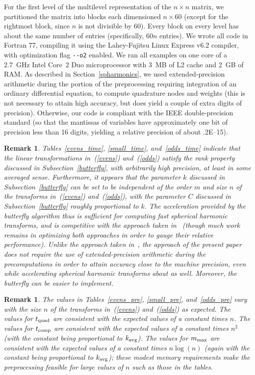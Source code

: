 \documentclass[final,3p,times]{elsarticle}
\newtheorem{remark1}[theorem]{Remark}
\newenvironment{remark}{\begin{remark1}\rm}{\end{remark1}}
\begin{document}
For the first level of the multilevel representation
of the $n \times n$ matrix, we partitioned the matrix
into blocks each dimensioned $n \times 60$
(except for the rightmost block, since $n$ is not divisible by 60).
Every block on every level has about the same number of entries
(specifically, $60n$ entries).
We wrote all code in Fortran 77, compiling it using
the Lahey-Fujitsu Linux Express v6.2 compiler, with optimization flag
{\tt {-}{-}o2} enabled.
We ran all examples on one core of a 2.7~GHz Intel Core~2 Duo microprocessor
with 3~MB of L2 cache and 2~GB of RAM.
As described in Section~\ref{spharmonics},
we used extended-precision arithmetic during the portion of the preprocessing
requiring integration of an ordinary differential equation,
to compute quadrature nodes and weights
(this is not necessary to attain high accuracy, but does yield a couple
of extra digits of precision).
Otherwise, our code is compliant with the IEEE double-precision standard
(so that the mantissas of variables have approximately one bit of precision
less than 16 digits, yielding a relative precision of about .2E--15).


\begin{remark}
\label{empirical_rank}
Tables~\ref{evens_time}, \ref{small_time}, and~\ref{odds_time}
indicate that the linear transformations in~(\ref{evens}) and~(\ref{odds})
satisfy the rank property discussed in Subsection~\ref{butterfly},
with arbitrarily high precision, at least in some averaged sense.
Furthermore, it appears that the parameter $k$ discussed
in Subsection~\ref{butterfly} can be set to be independent
of the order $m$ and size $n$ of the transforms in~(\ref{evens})
and~(\ref{odds}), with the parameter $C$ discussed
in Subsection~\ref{butterfly} roughly proportional to $k$.
The acceleration provided by the butterfly algorithm thus
is sufficient for computing fast spherical harmonic transforms,
and is competitive with the approach taken in~\cite{tygert_sph}
(though much work remains in optimizing both approaches
in order to gauge their relative performance).
Unlike the approach taken in~\cite{tygert_sph},
the approach of the present paper does not require the use
of extended-precision arithmetic during the precomputations
in order to attain accuracy close to the machine precision,
even while accelerating spherical harmonic transforms about as well.
Moreover, the butterfly can be easier to implement.
\end{remark}

\begin{remark}
The values in Tables~\ref{evens_pre}, \ref{small_pre}, and~\ref{odds_pre}
vary with the size $n$ of the transforms in~(\ref{evens}) and~(\ref{odds})
as expected.
The values for $t_{\rm quad}$
are consistent with the expected values of a constant times $n$.
The values for $t_{\rm comp}$
are consistent with the expected values of a constant times $n^2$
(with the constant being proportional to $k_{\rm avg}$).
The values for $m_{\rm max}$
are consistent with the expected values of a constant times $n \log(n)$
(again with the constant being proportional to $k_{\rm avg}$);
these modest memory requirements make the preprocessing feasible
for large values of $n$ such as those in the tables.
\end{remark}
\end{document}
